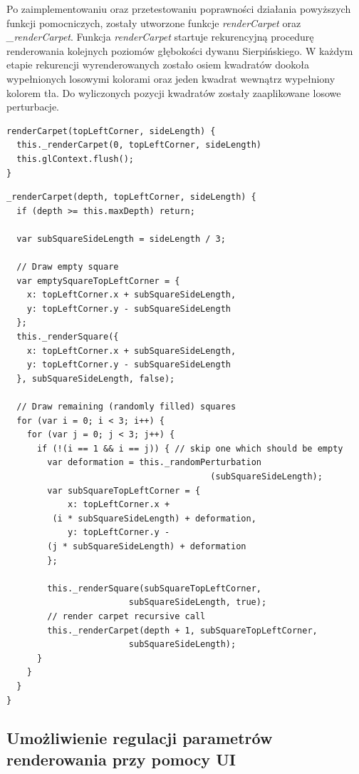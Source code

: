 \documentclass[a4paper,11pt]{article}
\begin{document}
Po zaimplementowaniu oraz przetestowaniu poprawności działania powyższych funkcji pomocniczych, zostały utworzone funkcje \textit{renderCarpet} oraz \textit{_renderCarpet}. Funkcja \textit{renderCarpet} startuje rekurencyjną procedurę renderowania kolejnych poziomów głębokości dywanu Sierpińskiego. W każdym etapie rekurencji wyrenderowanych zostało osiem kwadratów dookoła wypełnionych losowymi kolorami oraz jeden kwadrat wewnątrz wypełniony kolorem tła. Do wyliczonych pozycji kwadratów zostały zaaplikowane losowe perturbacje.

\begin{lstlisting}[caption=Definicja funkcji renderCarpet]
renderCarpet(topLeftCorner, sideLength) {
  this._renderCarpet(0, topLeftCorner, sideLength)
  this.glContext.flush();
}
\end{lstlisting}

\begin{lstlisting}[caption=Definicja funkcji rekurencyjnej _renderCarpet]
_renderCarpet(depth, topLeftCorner, sideLength) {
  if (depth >= this.maxDepth) return;

  var subSquareSideLength = sideLength / 3;

  // Draw empty square
  var emptySquareTopLeftCorner = {
    x: topLeftCorner.x + subSquareSideLength,
    y: topLeftCorner.y - subSquareSideLength
  };
  this._renderSquare({
    x: topLeftCorner.x + subSquareSideLength,
    y: topLeftCorner.y - subSquareSideLength
  }, subSquareSideLength, false);

  // Draw remaining (randomly filled) squares
  for (var i = 0; i < 3; i++) {
    for (var j = 0; j < 3; j++) {
      if (!(i == 1 && i == j)) { // skip one which should be empty
        var deformation = this._randomPerturbation
										(subSquareSideLength);
        var subSquareTopLeftCorner = {
          	x: topLeftCorner.x +
		 (i * subSquareSideLength) + deformation,
			y: topLeftCorner.y - 
		(j * subSquareSideLength) + deformation
        };

        this._renderSquare(subSquareTopLeftCorner, 
						subSquareSideLength, true);
        // render carpet recursive call
        this._renderCarpet(depth + 1, subSquareTopLeftCorner, 
						subSquareSideLength);
      }
    }
  }
}
\end{lstlisting}

\subsection{Umożliwienie regulacji parametrów renderowania przy pomocy UI}
\end{document}
